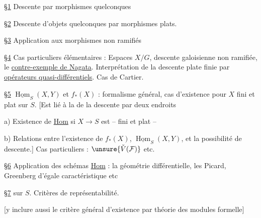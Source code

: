 
\uline{\S1} Descente  par morphismes quelconques

\uline{\S2} Descente d'objets quelconques par morphismes plats.

\uline{\S3} Application  aux morphismes non ramifiés

\uline{\S4} Cas particuliers élémentaires : Espaces $X/G$, descente galoisienne non ramifiée, le \uline{contre-exemple de Nagata}. Interprétation de la descente plate finie par \uline{opérateurs quasi-différentiels}. Cas de Cartier.

\uline{\S5} $\underline{\operatorname{Hom}}_S(X,Y)$ et $f_*(X)$ : formalisme général, cas d'existence pour $X$ fini et plat sur $S$. [Est lié à la  de la descente  par deux endroits

a) Existence de \uline{Hom} si $X\to S$ est  -- fini et plat --

b) Relations entre l'existence de $f_*(X)$, $\underline{\operatorname{Hom}}_S(X,Y)$, et la possibilité de descente.] Cas particuliers : $\unsure{\check V(\mathcal F)}$ etc.

\uline{\S6} Application des schémas \uline{Hom} : la géométrie différentielle, les Picard, Greenberg d'égale caractéristique etc

\uline{\S7}  sur $S$. Critères de représentabilité.

[y inclure aussi le critère général d'existence par théorie des modules formelle]

